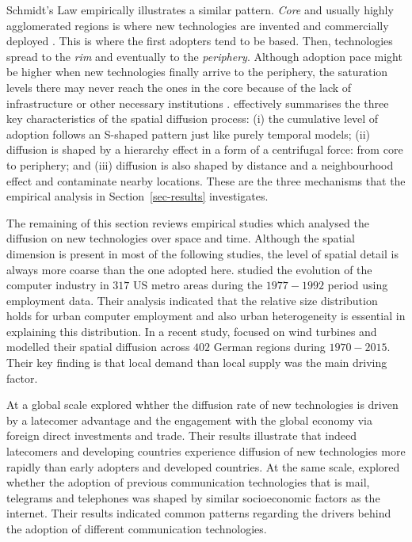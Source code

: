 \documentclass[
  authoryear,
  preprint,
  3p]{elsarticle}
\begin{document}
Schmidt's Law empirically illustrates a similar pattern. \emph{Core} and
usually highly agglomerated regions is where new technologies are
invented and commercially deployed \citep{grubler1990rise}. This is
where the first adopters tend to be based. Then, technologies spread to
the \emph{rim} and eventually to the \emph{periphery}. Although adoption
pace might be higher when new technologies finally arrive to the
periphery, the saturation levels there may never reach the ones in the
core because of the lack of infrastructure or other necessary
institutions \citep{leibowicz2016representing}. \citet{grubler1990rise}
effectively summarises the three key characteristics of the spatial
diffusion process: (i) the cumulative level of adoption follows an
S-shaped pattern just like purely temporal models; (ii) diffusion is
shaped by a hierarchy effect in a form of a centrifugal force: from core
to periphery; and (iii) diffusion is also shaped by distance and a
neighbourhood effect and contaminate nearby locations. These are the
three mechanisms that the empirical analysis in
Section~\ref{sec-results} investigates.

The remaining of this section reviews empirical studies which analysed
the diffusion on new technologies over space and time. Although the
spatial dimension is present in most of the following studies, the level
of spatial detail is always more coarse than the one adopted here.
\citet{beardsell1999spatial} studied the evolution of the computer
industry in \(317\) US metro areas during the \(1977-1992\) period using
employment data. Their analysis indicated that the relative size
distribution holds for urban computer employment and also urban
heterogeneity is essential in explaining this distribution. In a recent
study, \citet{bednarz2020pulled} focused on wind turbines and modelled
their spatial diffusion across \(402\) German regions during
\(1970-2015\). Their key finding is that local demand than local supply
was the main driving factor.

At a global scale \citet{perkins2005international} explored whther the
diffusion rate of new technologies is driven by a latecomer advantage
and the engagement with the global economy via foreign direct
investments and trade. Their results illustrate that indeed latecomers
and developing countries experience diffusion of new technologies more
rapidly than early adopters and developed countries. At the same scale,
\citet{perkins2011internet} explored whether the adoption of previous
communication technologies that is mail, telegrams and telephones was
shaped by similar socioeconomic factors as the internet. Their results
indicated common patterns regarding the drivers behind the adoption of
different communication technologies.
\end{document}
